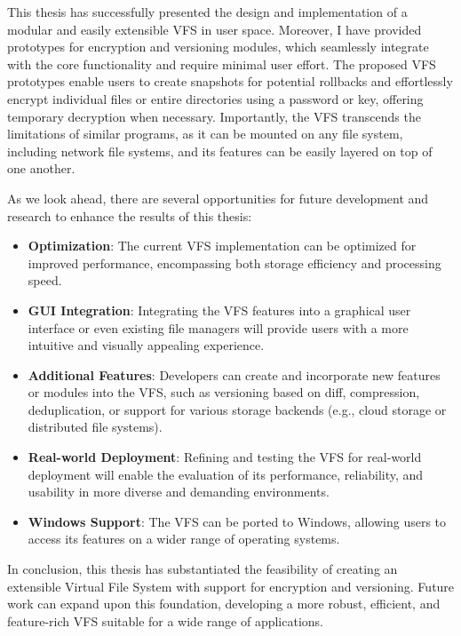 
This thesis has successfully presented the design and implementation of a modular and easily extensible VFS in user space.
Moreover, I have provided prototypes for encryption and versioning modules, which seamlessly integrate with the core functionality and require minimal user effort.
The proposed VFS prototypes enable users to create snapshots for potential rollbacks and effortlessly encrypt individual files or entire directories using a password or key, offering temporary decryption when necessary.
Importantly, the VFS transcends the limitations of similar programs, as it can be mounted on any file system, including network file systems, and its features can be easily layered on top of one another.

As we look ahead, there are several opportunities for future development and research to enhance the results of this thesis:

\begin{itemize}
    \item \textbf{Optimization}: The current VFS implementation can be optimized for improved performance, encompassing both storage efficiency and processing speed.
    \item \textbf{GUI Integration}: Integrating the VFS features into a graphical user interface or even existing file managers will provide users with a more intuitive and visually appealing experience.
    \item \textbf{Additional Features}: Developers can create and incorporate new features or modules into the VFS, such as versioning based on diff, compression, deduplication, or support for various storage backends (e.g., cloud storage or distributed file systems).
    \item \textbf{Real-world Deployment}: Refining and testing the VFS for real-world deployment will enable the evaluation of its performance, reliability, and usability in more diverse and demanding environments.
    \item \textbf{Windows Support}: The VFS can be ported to Windows, allowing users to access its features on a wider range of operating systems.
\end{itemize}

In conclusion, this thesis has substantiated the feasibility of creating an extensible Virtual File System with support for encryption and versioning.
Future work can expand upon this foundation, developing a more robust, efficient, and feature-rich VFS suitable for a wide range of applications.
